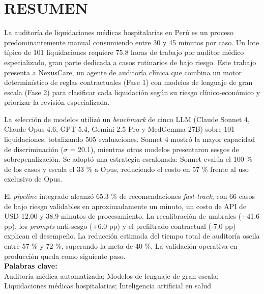 \chapter*{\center \Large \vspace{-4.5cm} RESUMEN}
\thispagestyle{empty}
\noindent
La auditoría de liquidaciones médicas hospitalarias en Perú es un proceso predominantemente manual consumiendo entre 30 y 45 minutos por caso. Un lote típico de 101 liquidaciones requiere 75.8 horas de trabajo por auditor médico especializado, gran parte dedicada a casos rutinarios de bajo riesgo. Este trabajo presenta a NexusCare, un agente de auditoría clínica que combina un motor determinístico de reglas contractuales (Fase 1) con modelos de lenguaje de gran escala (Fase 2) para clasificar cada liquidación según su riesgo clínico-económico y priorizar la revisión especializada.

La selección de modelos utilizó un \textit{benchmark} de cinco LLM (Claude Sonnet 4, Claude Opus 4.6, GPT-5.4, Gemini 2.5 Pro y MedGemma 27B) sobre 101 liquidaciones, totalizando 505 evaluaciones. Sonnet 4 mostró la mayor capacidad de discriminación ($\sigma$ = 20.1), mientras otros modelos presentaron sesgos de sobrepenalización. Se adoptó una estrategia escalonada: Sonnet evalúa el 100 \% de los casos y escala el 33 \% a Opus, reduciendo el costo en 57 \% frente al uso exclusivo de Opus.

El \textit{pipeline} integrado alcanzó 65.3 \% de recomendaciones \textit{fast-track}, con 66 casos de bajo riesgo validables en aproximadamente un minuto, un costo de API de USD 12.00 y 38.9 minutos de procesamiento. La recalibración de umbrales (+41.6 pp), los \textit{prompts} anti-sesgo (+6.0 pp) y el prefiltrado contractual (-7.0 pp) explican el desempeño. La reducción estimada del tiempo total de auditoría oscila entre 57 \% y 72 \%, superando la meta de 40 \%. La validación operativa en producción queda como siguiente paso. \\

\noindent \textbf{Palabras clave:}\\
\noindent Auditoría médica automatizada; Modelos de lenguaje de gran escala; Liquidaciones médicas hospitalarias; Inteligencia artificial en salud
